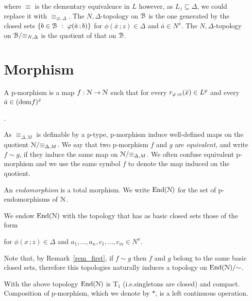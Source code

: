 where $\equiv$ is the elementary equivalence in $L$ however, as $L_z\subseteq\Delta$, we could replace it with $\equiv_{\varnothing,\Delta}$.
The $N,\Delta$-topology on $\B$ is the one generated by the closed sets $\{b\in\B\ :\ \phi(\bar a\,;b)\}$ for $\phi(\bar x\,;z)\in\Delta$ and $\bar a\in N^{\bar x}$.
The $N,\Delta$-topology on $\B/{\equiv_{N,\Delta}}$ is the quotient of that on $\B$.



\section{Morphism}

A p-morphism is a map $f:\N\to\N$ such that for every $r_{\phi\,;\alpha}(\bar x)\in L^{\rm p}$ and every $\bar a\in({\rm dom}f)^{\bar x}$

.

As $\equiv_{\Delta,M}$ is definable by a p-type, p-morphism induce well-defined maps on the quotient $\N/{\equiv_{\Delta,M}}$.
We say that two p-morphism $f$ and $g$ are \emph{equivalent,} and write $f\sim g$, if they induce the same map on $\N/{\equiv_{\Delta,M}}$.
We often confuse equivalent p-morphism and we use the same symbol $f$ to denote the map induced on the quotient.

An \emph{endomorphism\/} is a total morphism.
We write \emph{${\rm End}(\N)$} for the set of p-endo\-mor\-ph\-isms of $\N$.

\begin{definition}\label{def_topology}
  We endow ${\rm End}(\N)$ with the topology that has as basic closed sets those of the form 

  \smallskip

  for $\phi(x\,;z)\in\Delta$ and $a_1,\dots,a_n,c_1,\dots,c_m\in N^x$.
\end{definition}

Note that, by Remark~\ref{rem_first}, if $f\sim g$ then $f$ and $g$ belong to the same basic closed sets, therefore this topologies naturally induces a topology on ${\rm End}(\N)/{\sim}$.

\begin{fact}
  With the above topology ${\rm End}(\N)$ is T$_1$ (i.e.\@ singletons are closed) and compact.
  Composition of p-morphism, which we denote by $*$, is a left continuous operation.
\end{fact}

